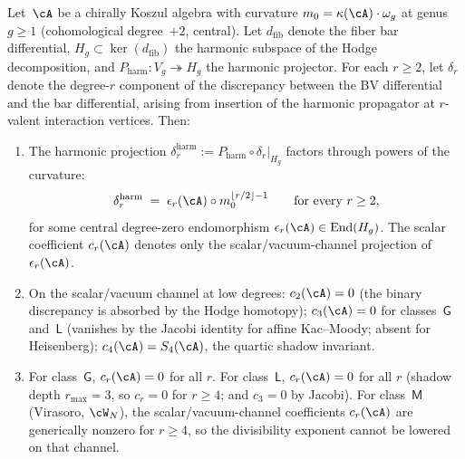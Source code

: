 \begin{proposition}%
\label{prop:harmonic-factorization}%
%
%
%
Let~$\cA$ be a chirally Koszul algebra with curvature
$m_0 = \kappa(\cA)\cdot\omega_g$ at genus $g \geq 1$
\textup{(}cohomological degree~$+2$, central\textup{)}.
Let $d_{\mathrm{fib}}$ denote the fiber bar differential,
$H_g \subset \ker(d_{\mathrm{fib}})$ the harmonic subspace
of the Hodge decomposition, and
$P_{\mathrm{harm}} \colon V_g \twoheadrightarrow H_g$
the harmonic projector. For each $r \geq 2$, let
$\delta_r$ denote the degree-$r$ component of the discrepancy
between the BV differential and the bar differential, arising
from insertion of the harmonic propagator at
$r$-valent interaction vertices. Then:
\begin{enumerate}[label=\textup{(\roman*)}]
\item The harmonic projection
$\delta_r^{\mathrm{harm}}
:= P_{\mathrm{harm}} \circ \delta_r \big|_{H_g}$
factors through powers of the curvature:
\[
\delta_r^{\mathrm{harm}}
\;=\;
\epsilon_r(\cA)\circ m_0^{\lfloor r/2 \rfloor - 1}
\qquad\text{for every } r \geq 2,
\]
for some central degree-zero endomorphism
$\epsilon_r(\cA)\in \operatorname{End}(H_g)$. The scalar
coefficient $c_r(\cA)$ denotes only the scalar/vacuum-channel
projection of~$\epsilon_r(\cA)$.
\item On the scalar/vacuum channel at low degrees:
$c_2(\cA) = 0$ \textup{(}the binary discrepancy is absorbed
by the Hodge homotopy\textup{)};
$c_3(\cA) = 0$ for classes~$\mathsf{G}$ and~$\mathsf{L}$
\textup{(}vanishes by the Jacobi identity for affine
Kac--Moody; absent for Heisenberg\textup{)};
$c_4(\cA) = S_4(\cA)$, the quartic shadow invariant.
\item For class~$\mathsf{G}$, $c_r(\cA) = 0$ for all $r$.
For class~$\mathsf{L}$, $c_r(\cA) = 0$ for all $r$
\textup{(}shadow depth $r_{\max} = 3$, so $c_r = 0$ for $r \geq 4$;
and $c_3 = 0$ by Jacobi\textup{)}.
For class~$\mathsf{M}$ \textup{(}Virasoro, $\cW_N$\textup{)},
the scalar/vacuum-channel coefficients $c_r(\cA)$ are generically
nonzero for $r \geq 4$, so the divisibility exponent cannot be
lowered on that channel.
\end{enumerate}
\end{proposition}

